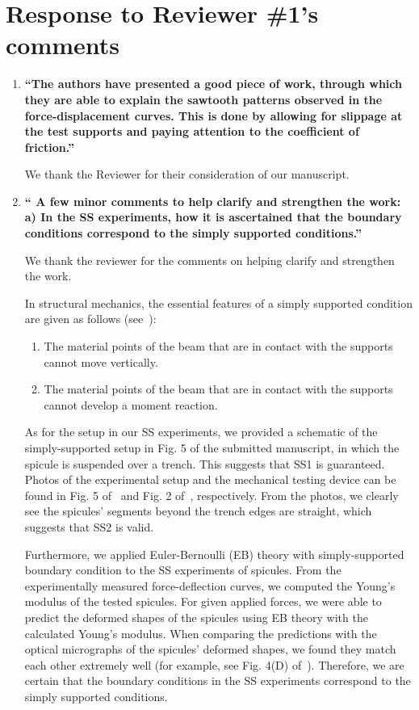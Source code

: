 \documentclass[11pt,letterpaper]{report}
\begin{document}
\clearpage
\section*{Response to Reviewer \#1's comments}
\label{rev1}

\begin{enumerate}[label=\textit{1.\arabic*},wide, labelwidth=!, labelindent=0pt]

\item \label{r1c1} {\bf ``The authors have presented a good piece of work, through which they are able to explain the sawtooth patterns observed in the force-displacement curves. This is done by allowing for slippage at the test supports and paying attention to the coefficient of friction.''}

We thank the Reviewer for their consideration of our manuscript.

\item \label{r1c2} {\bf `` A few minor comments to help clarify and strengthen the work: a) In the SS experiments, how it is ascertained that the boundary conditions correspond to the simply supported conditions.''}

We thank the reviewer for the comments on helping clarify and strengthen the work.

In structural mechanics, the essential features of a simply supported condition are given as follows (see~\cite{gere1997mechanics}):
\begin{enumerate}[label=\textit{(SS\arabic*).},leftmargin = 1.5 cm]
\item The material points of the beam that are in contact with the supports cannot move vertically.
\item The material points of the beam that are in contact with the supports cannot develop a moment reaction.
\end{enumerate}


As for the setup in our SS experiments, we provided a schematic of the simply-supported setup in Fig. 5 of the submitted manuscript, in which the spicule is suspended over a trench. This suggests that SS1 is guaranteed. Photos of the experimental setup and the mechanical testing device can be found in Fig. 5 of~\cite{kochiyama2021sawtooth} and Fig. 2 of~\cite{monn2017enhanced}, respectively. From the photos, we clearly see the spicules' segments beyond the trench edges are straight, which suggests that SS2 is valid.

Furthermore, we applied Euler-Bernoulli (EB) theory with simply-supported boundary condition to the SS experiments of spicules. From the experimentally measured force-deflection curves, we computed the Young's modulus of the tested spicules. For given applied forces, we were able to predict the deformed shapes of the spicules using EB theory with the calculated Young's modulus. When comparing the predictions with the optical micrographs of the spicules' deformed shapes, we found they match each other extremely well (for example, see Fig. 4(D) of~\cite{monn2017enhanced}). Therefore, we are certain that the boundary conditions in the SS experiments correspond to the simply supported conditions.



\end{enumerate}
\end{document}
